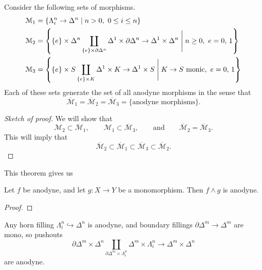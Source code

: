 \documentclass[main.tex]{subfiles}
\begin{document}
\begin{theorem}
  \label{thm:saturated_hull_of_various_sets_are_anodyne_morphisms}
  Consider the following sets of morphisms.
  \begin{align*}
    \mathcal{M}_{1} &= \left\{ \Lambda^{n}_{i} \to \Delta^{n} \mid n > 0,\ 0 \leq i \leq n \right\} \\
    \mathcal{M}_{2} &= \left\{ \{e\} \times \Delta^{n} \coprod_{\{e\} \times \partial \Delta^{n}} \Delta^{1} \times \partial\Delta^{n} \to \Delta^{1} \times \Delta^{n} \Biggm| n \geq 0,\ e = 0,\, 1 \right\} \\
    \mathcal{M}_{3} &= \left\{ \{e\} \times S \coprod_{\{e\} \times K} \Delta^{1} \times K \to \Delta^{1} \times S \Biggm| K \to S\ \text{monic},\ e = 0,\, 1 \right\}
  \end{align*}
  Each of these sets generate the set of all anodyne morphisms in the sense that
  \begin{equation*}
    \overline{\mathcal{M}}_{1} = \overline{\mathcal{M}}_{2} = \overline{\mathcal{M}}_{3} = \{\text{anodyne morphisms}\}.
  \end{equation*}
\end{theorem}
\begin{proof}[Sketch of proof]
  We will show that
  \begin{equation*}
    \mathcal{M}_{2} \subset \overline{\mathcal{M}}_{1},\qquad \mathcal{M}_{1} \subset \overline{\mathcal{M}}_{3},\qquad \text{and}\qquad \overline{\mathcal{M}}_{2} = \overline{\mathcal{M}}_{3}.
  \end{equation*}
  This will imply that
  \begin{equation*}
    \overline{\mathcal{M}}_{2} \subset \overline{\mathcal{M}}_{1} \subset \overline{\mathcal{M}}_{3} \subset \overline{\mathcal{M}}_{2}.
  \end{equation*}
\end{proof}

This theorem gives us 

\begin{corollary}
  Let $f$ be anodyne, and let $g\colon X \to Y$ be a monomorphism. Then $f \wedge g$ is anodyne.
\end{corollary}
\begin{proof}

\end{proof}

\begin{example}
  \label{eg:boundary_filling_times_horn_filling_is_anodyne}
  Any horn filling $\Lambda^{n}_{i} \hookrightarrow \Delta^{n}$ is anodyne, and boundary fillings $\partial \Delta^{m} \to \Delta^{m}$ are mono, so pushouts
  \begin{equation*}
    \partial \Delta^{m} \times \Delta^{n} \coprod_{\partial \Delta^{m} \times \Lambda^{n}_{i}} \Delta^{m} \times \Lambda^{n}_{i} \to \Delta^{m} \times \Delta^{n}
  \end{equation*}
  are anodyne.
\end{example}
\end{document}
